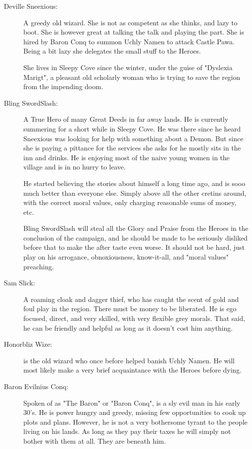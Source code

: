 \documentclass[11pt, twoside, titlepage, a4paper]{report}
\begin{document}
\begin{description}

\item[Deville Sneexious:] A greedy old wizard. She is not as competent as she thinks, and lazy to boot. She is however great at talking the talk and playing the part. She is hired by Baron Conq to summon Uchly Namen to attack Castle Pawa. Being a bit lazy she delegates the small stuff to the Heroes.

She lives in Sleepy Cove since the winter, under the guise of "Dyslexia Marigt", a pleasant old scholarly woman who is trying to save the region from the impending doom.


\item[Bling SwordSlash:] A True Hero of many Great Deeds in far away lands. He is currently summering for a short while in Sleepy Cove. He was there since he heard Sneexious was looking for help with something about a Demon. But since she is paying a pittance for the services she asks for he mostly sits in the inn and drinks. He is enjoying most of the naive young women in the village and is in no hurry to leave.

He started believing the stories about himself a long time ago, and is sooo much better than everyone else. Simply above all the other cretins around, with the correct moral values, only charging reasonable sums of money, etc.

Bling SwordSlash will steal all the Glory and Praise from the Heroes in the conclusion of the campaign, and he should be made to be seriously disliked before that to make the after taste even worse. It should not be hard, just play on his arrogance, obnoxiousness, know-it-all, and "moral values" preaching.


\item[Sam Slick:] A roaming cloak and dagger thief, who has caught the scent of gold and foul play in the region. There must be money to be liberated. He is ego focused, direct, and very skilled, with very flexible grey morals. That said, he can be friendly and helpful as long as it doesn't cost him anything.


\item[Honorbliz Wize:] is the old wizard who once before helped banish Uchly Namen. He will most likely make a very brief acquaintance with the Heroes before dying.


\item[Baron Evilnius Conq:] Spoken of as "The Baron" or "Baron Conq", is a sly evil man in his early 30's. He is power hungry and greedy, missing few opportunities to cook up plots and plans. However, he is not a very bothersome tyrant to the people living on his lands. As long as they pay their taxes he will simply not bother with them at all. They are beneath him.


\end{description}
\end{document}
